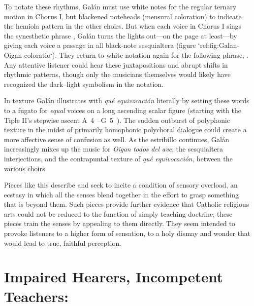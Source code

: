 To notate these rhythms, Galán must use white notes for the regular ternary motion in Chorus I, but blackened noteheads (mensural coloration) to indicate the hemiola pattern in the other choirs.
But when each voice in Chorus I sings the synesthetic phrase , Galán turns the lights out---on the page at least---by giving each voice a passage in all black-note sesquialtera (figure `ref:fig:Galan-Oigan-coloratio`).
They return to white notation again for the following phrase, .
Any attentive listener could hear these juxtapositions and abrupt shifts in rhythmic patterns, though only the musicians themselves would likely have recognized the dark--light symbolism in the notation.
\Autocite[36]{Kendrick:Jeremiah}


\label{fig:Galan-Oigan-coloratio}
In texture Galán illustrates with \emph{qué equivocación} literally by setting these words to a fugato for \emph{equal} voices on a long ascending scalar figure (starting with the Tiple II's stepwise ascent A~4~--G~5~).
The sudden outburst of polyphonic texture in the midst of primarily homophonic polychoral dialogue could create a more affective sense of confusion as well.
As the estribillo continues, Galán increasingly mixes up the music for \emph{Oigan todos del ave}, the sesquialtera interjections, and the contrapuntal texture of \emph{qué equivocación}, between the various choirs.

Pieces like this describe and seek to incite a condition of sensory overload, an ecstasy in which all the senses blend together in the effort to grasp something that is beyond them.
Such pieces provide further evidence that Catholic religious arts could not be reduced to the function of simply teaching doctrine; these pieces train the senses by appealing to them directly.
They seem intended to provoke listeners to a higher form of sensation, to a holy dismay and wonder that would lead to true, faithful perception.


\section{Impaired Hearers, Incompetent Teachers: }

